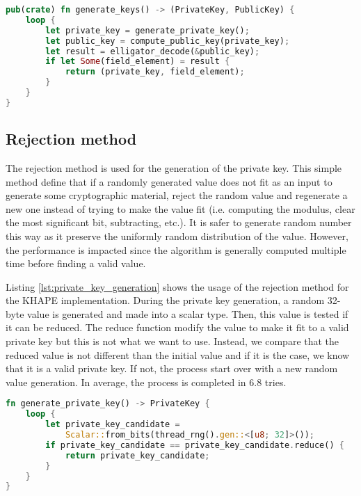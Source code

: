\documentclass[../report.tex]{subfiles}
\begin{document}
\begin{lstlisting}[language=Rust, caption=Key generation function, label={lst:key_generation}]
pub(crate) fn generate_keys() -> (PrivateKey, PublicKey) {
    loop {
        let private_key = generate_private_key();
        let public_key = compute_public_key(private_key);
        let result = elligator_decode(&public_key);
        if let Some(field_element) = result {
            return (private_key, field_element);
        }
    }
}
\end{lstlisting}


\subsection{Rejection method}

The rejection method \cite{CAA} is used for the generation of the private key.
This simple method define that if a randomly generated value does not fit as an input to generate some cryptographic material, reject the random value and regenerate a new one instead of trying to make the value fit (i.e. computing the modulus, clear the most significant bit, subtracting, etc.). 
It is safer to generate random number this way as it preserve the uniformly random distribution of the value. However, the performance is impacted since the algorithm is generally computed multiple time before finding a valid value.

Listing \ref{lst:private_key_generation} shows the usage of the rejection method for the KHAPE implementation. During the private key generation, a random 32-byte value is generated and made into a scalar type. Then, this value is tested if it can be reduced. The reduce function modify the value to make it fit to a valid private key but this is not what we want to use.
Instead, we compare that the reduced value is not different than the initial value and if it is the case, we know that it is a valid private key. If not, the process start over with a new random value generation.
In average, the process is completed in 6.8 tries.

\begin{lstlisting}[language=Rust, caption=Private key generation function, label={lst:private_key_generation}]
fn generate_private_key() -> PrivateKey {
    loop {
        let private_key_candidate = 
            Scalar::from_bits(thread_rng().gen::<[u8; 32]>());
        if private_key_candidate == private_key_candidate.reduce() {
            return private_key_candidate;
        }
    }
}
\end{lstlisting}
\end{document}
